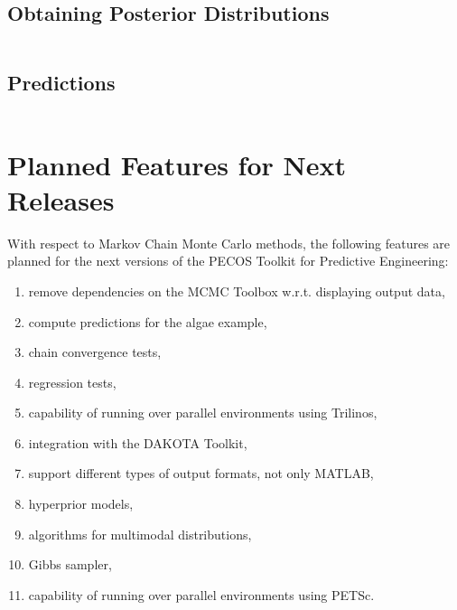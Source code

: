 \subsection{Obtaining Posterior Distributions}
$~$\\

\subsection{Predictions}
$~$\\

\clearpage

\section{Planned Features for Next Releases}\label{sc-gmc-planned-features}
With respect to Markov Chain Monte Carlo methods, the following features are planned for the next versions of the PECOS Toolkit for Predictive Engineering:
\begin{enumerate}
\item remove dependencies on the MCMC Toolbox w.r.t. displaying output data,
\item compute predictions for the algae example,
\item chain convergence tests,
\item regression tests,
\item capability of running over parallel environments using Trilinos,
\item integration with the DAKOTA Toolkit,
\item support different types of output formats, not only MATLAB,
\item hyperprior models,
\item algorithms for multimodal distributions,
\item Gibbs sampler,
\item capability of running over parallel environments using PETSc.
\end{enumerate}
 
